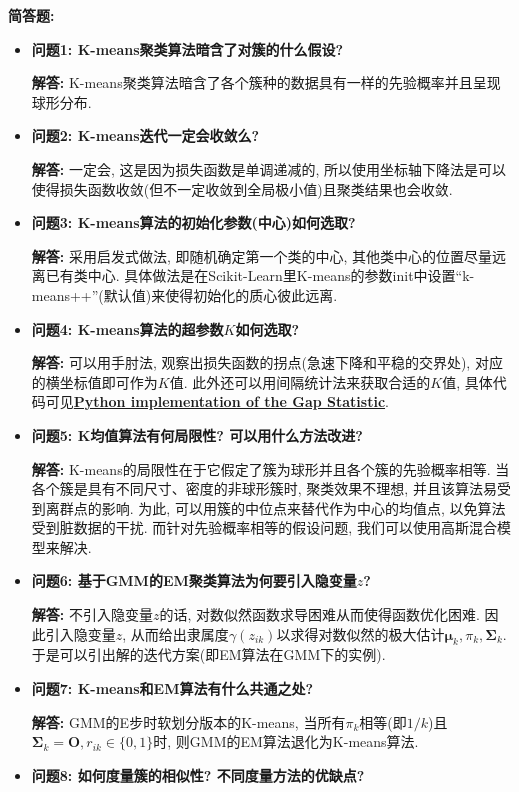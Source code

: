 \documentclass{article}
\begin{document}
\pagebreak

\begin{homeworkProblem}
	\textbf{简答题:}
	\begin{itemize}
		\item \textbf{问题1: K-means聚类算法暗含了对簇的什么假设?}
		
		\textbf{解答:} K-means聚类算法暗含了各个簇种的数据具有一样的先验概率并且呈现球形分布.
		\item \textbf{问题2: K-means迭代一定会收敛么?}
		
		\textbf{解答:} 一定会, 这是因为损失函数是单调递减的, 所以使用坐标轴下降法是可以使得损失函数收敛(但不一定收敛到全局极小值)且聚类结果也会收敛.
		\item \textbf{问题3: K-means算法的初始化参数(中心)如何选取?}
		
		\textbf{解答:} 采用启发式做法, 即随机确定第一个类的中心, 其他类中心的位置尽量远离已有类中心. 具体做法是在Scikit-Learn里K-means的参数init中设置“k-means++”(默认值)来使得初始化的质心彼此远离.
		\item \textbf{问题4: K-means算法的超参数$K$如何选取?}
		
		\textbf{解答:} 可以用手肘法, 观察出损失函数的拐点(急速下降和平稳的交界处), 对应的横坐标值即可作为$K$值. 此外还可以用间隔统计法来获取合适的$K$值, 具体代码可见\href{https://github.com/milesgranger/gap_statistic}{\textbf{Python implementation of the Gap Statistic}}.
		\item \textbf{问题5: K均值算法有何局限性? 可以用什么方法改进?}
		
		\textbf{解答:} K-means的局限性在于它假定了簇为球形并且各个簇的先验概率相等. 当各个簇是具有不同尺寸、密度的非球形簇时, 聚类效果不理想, 并且该算法易受到离群点的影响. 为此, 可以用簇的中位点来替代作为中心的均值点, 以免算法受到脏数据的干扰. 而针对先验概率相等的假设问题, 我们可以使用高斯混合模型来解决.
		\item \textbf{问题6: 基于GMM的EM聚类算法为何要引入隐变量$z$?}
		
		\textbf{解答:} 不引入隐变量$z$的话, 对数似然函数求导困难从而使得函数优化困难. 因此引入隐变量$z$, 从而给出隶属度$\gamma(z_{ik})$以求得对数似然的极大估计$\boldsymbol{\mu}_k,\pi_k,\boldsymbol{\Sigma}_k$. 于是可以引出解的迭代方案(即EM算法在GMM下的实例).
		\item \textbf{问题7: K-means和EM算法有什么共通之处?}
		
		\textbf{解答:} GMM的E步时软划分版本的K-means, 当所有$\pi_k$相等(即$1/k$)且$\boldsymbol{\Sigma}_k=\boldsymbol{O},r_{ik}\in \{0,1\}$时, 则GMM的EM算法退化为K-means算法.
		\item \textbf{问题8: 如何度量簇的相似性? 不同度量方法的优缺点?}
		

\end{itemize}
\end{homeworkProblem}
\end{document}
